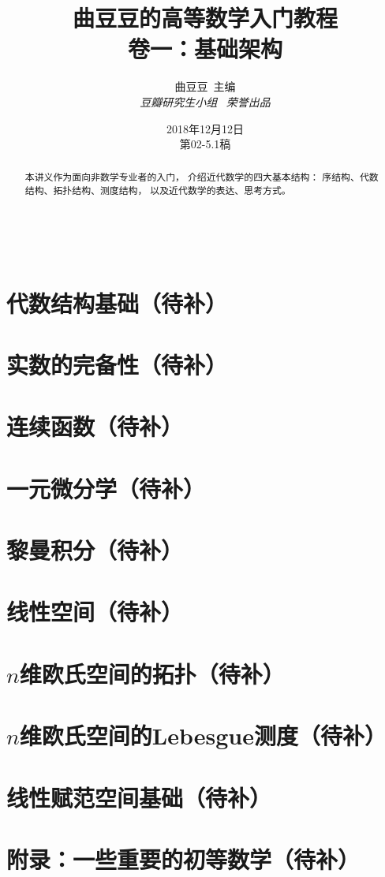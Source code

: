 \documentclass[a4paper, 11pt]{article} %
\title{\textbf{曲豆豆的高等数学入门教程}\\$\,$\\%
卷一：基础架构} %
\author{\textsc{曲豆豆\,\,\,主编} %
\\{\textit{豆瓣研究生小组\,\,\,\,\,荣誉出品}}} %
\date{2018年12月12日\\
第02-5.1稿} %
\makeatletter
\renewcommand{\maketitle}{ %
\begin{center} %
{\Huge\@title} %

\vspace{50pt} %

{\Large\@author} %
\\\@date %

\vspace{20pt} %
\end{center}
}
\makeatother
\begin{document}
\maketitle


\begin{abstract}
本讲义作为面向非数学专业者的入门，
介绍近代数学的四大基本结构：
序结构、代数结构、拓扑结构、测度结构，
以及近代数学的表达、思考方式。
\end{abstract}

\tableofcontents
\newpage

\newpage




\section{代数结构基础（待补）}
\section{实数的完备性（待补）}
\section{连续函数（待补）}
\section{一元微分学（待补）}
\section{黎曼积分（待补）}
\section{线性空间（待补）}
\section{$n$维欧氏空间的拓扑（待补）}
\section{$n$维欧氏空间的Lebesgue测度（待补）}
\section{线性赋范空间基础（待补）}
\section{附录：一些重要的初等数学（待补）}
\end{document}
